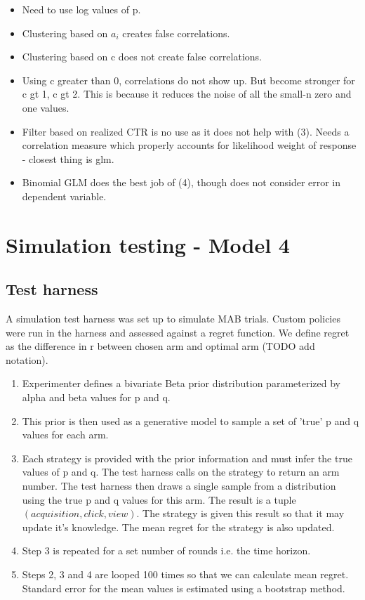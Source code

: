 \documentclass[12pt]{article}
\begin{document}
\begin{itemize}
	\item Need to use log values of p.
	\item Clustering based on $a_i$ creates false correlations.
	\item Clustering based on c does not create false correlations.
	\item Using c greater than 0, correlations do not show up. But become stronger for c gt 1, c gt 2. This is because it reduces the noise of all the small-n zero and one values.
	\item Filter based on realized CTR is no use as it does not help with (3). Needs a correlation measure which properly accounts for likelihood weight of response - closest thing is glm.
	\item Binomial GLM does the best job of (4), though does not consider error in dependent variable.
\end{itemize}

\pagebreak

\section{ Simulation testing - Model 4}

\subsection{Test harness}

A simulation test harness was set up to simulate MAB trials. Custom policies were run in the harness and assessed against a regret function. We define regret as the difference in r between chosen arm and optimal arm (TODO add notation).

\begin{enumerate}
	\item Experimenter defines a bivariate Beta prior distribution parameterized by alpha and beta values for p and q.
	\item This prior is then used as a generative model to sample a set of 'true' p and q values for each arm.
	\item Each strategy is provided with the prior information and must infer the true values of p and q. The test harness calls on the strategy to return an arm number. The test harness then draws a single sample from a distribution using the true p and q values for this arm. The result is a tuple $(acquisition,click,view)$. The strategy is given this result so that it may update it's knowledge. The mean regret for the strategy is also updated.
	\item Step 3 is repeated for a set number of rounds i.e. the time horizon.
	\item Steps 2, 3 and 4 are looped 100 times so that we can calculate mean regret. Standard error for the mean values is estimated using a bootstrap method.
\end{enumerate}
\end{document}
